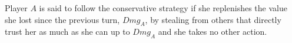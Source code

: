 {}
\begin{definition}
  Player $A$ is said to follow the conservative strategy if she replenishes the value she lost since the previous turn,
  $Dmg_A$, by stealing from others that directly trust her as much as she can up to $Dmg_A$ and she takes no other
  action.
\end{definition}
